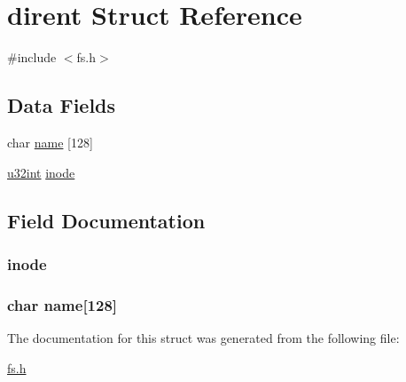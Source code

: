 \hypertarget{structdirent}{
\section{dirent Struct Reference}
\label{structdirent}
}


{\ttfamily \#include $<$fs.h$>$}

\subsection*{Data Fields}
\begin{DoxyCompactItemize}
\item 
char \hyperlink{structdirent_a93a4209b66c75fd711969ba8dcd926f5}{name} \mbox{[}128\mbox{]}
\item 
\hyperlink{library_8h_ad7ecf93b77285d9bf039d27fa3f1a588}{u32int} \hyperlink{structdirent_a1ea843802457b0d31c6d2d2d5c662077}{inode}
\end{DoxyCompactItemize}


\subsection{Field Documentation}
\hypertarget{structdirent_a1ea843802457b0d31c6d2d2d5c662077}{
\subsubsection[{inode}]{ {\bf inode}}}
\label{structdirent_a1ea843802457b0d31c6d2d2d5c662077}
\hypertarget{structdirent_a93a4209b66c75fd711969ba8dcd926f5}{
\subsubsection[{name}]{\setlength{\rightskip}{0pt plus 5cm}char {\bf name}\mbox{[}128\mbox{]}}}
\label{structdirent_a93a4209b66c75fd711969ba8dcd926f5}


The documentation for this struct was generated from the following file:\begin{DoxyCompactItemize}
\item 
\hyperlink{fs_8h}{fs.h}\end{DoxyCompactItemize}

